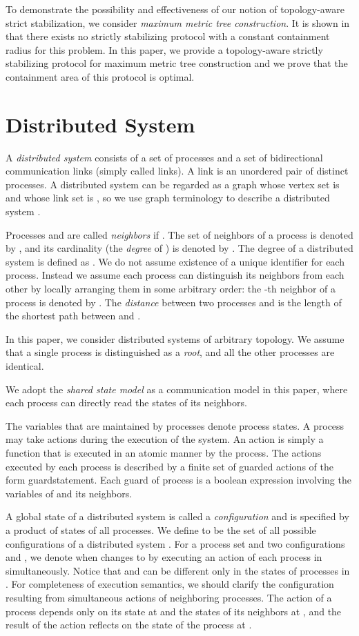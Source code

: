 \documentclass[11pt]{article}
\begin{document}
To demonstrate the possibility and effectiveness of our notion of topology-aware strict stabilization, we consider \emph{maximum metric tree construction}. It is shown in \cite{NA02c} that there exists no strictly stabilizing protocol with a constant containment radius for this problem. In this paper, we provide a topology-aware strictly stabilizing protocol for maximum metric tree construction and we prove that the containment area of this protocol is optimal.

\section{Distributed System}

A \emph{distributed system}  consists of a set
 of processes and a set  of
bidirectional communication links (simply called links).
A link is an unordered pair of distinct processes.
A distributed system  can be regarded as a graph whose vertex set is 
and whose link set is , so we use graph terminology to describe a
distributed system .

Processes  and  are called \emph{neighbors} if .
The set of neighbors of a process  is denoted by , and its
cardinality (the \emph{degree} of ) is denoted by .
The degree  of a distributed system  is defined as
.
We do not assume existence of a unique identifier for each process.
Instead we assume each process can distinguish its neighbors from each other
by locally arranging them in some arbitrary order:
the -th neighbor of a process  is denoted by
. The \emph{distance} between two processes
 and  is the length of the shortest path between  and .

In this paper, we consider distributed systems of arbitrary topology.
We assume that a single process is distinguished as a \emph{root},
and all the other processes are identical.

We adopt the \emph{shared state model} as a communication model
in this paper, where each process can directly read the states
of its neighbors.

The variables that are maintained by processes denote process states.
A process may take actions during the execution of the system. An
action is simply a function that is executed in an atomic manner
by the process.
The actions executed by each process is described by a finite set
of guarded actions of the form
guardstatement.
Each guard of process  is a boolean expression involving
the variables of  and its neighbors.

A global state of a distributed system is called a \emph{configuration}
and is specified by a product of states of all processes.
We define  to be the set of all possible configurations
of a distributed system .
For a process set  and two configurations  and ,
we denote 
when  changes to  by executing an action of each process
in  simultaneously.
Notice that  and  can be different only in
the states of processes in .
For completeness of execution semantics, we should clarify
the configuration resulting from simultaneous actions of
neighboring processes.
The action of a process depends only on its state
at  and the states of its neighbors at ,
and the result of the action reflects on the state of the process
at .
\end{document}
